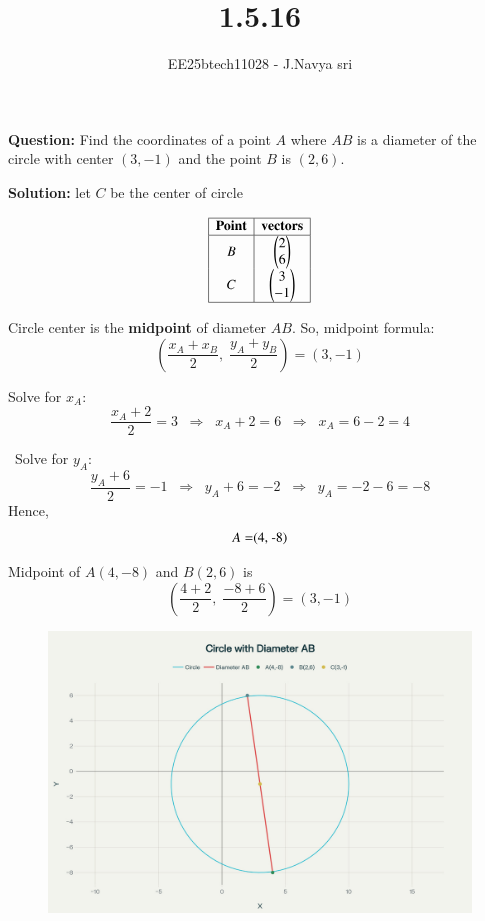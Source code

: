 \documentclass[journal]{IEEEtran}
\begin{document}

\vspace{3cm}

\title{1.5.16}
\author{EE25btech11028 - J.Navya sri}
{\let\newpage\relax\maketitle}

\renewcommand{\thefigure}{\theenumi}
\renewcommand{\thetable}{\theenumi}
\setlength{\intextsep}{10pt} %


\renewcommand{\thetable}{\theenumi}
\textbf{Question:}  
Find the coordinates of a point $A$ where $AB$ is a diameter of the circle with center  
$(3, -1)$ and the point $B$ is $(2, 6)$.

\textbf{Solution:}
let $C$ be the center of circle
\bigskip

 

\[
\begin{array}{|c|c|c|c|}
\hline
\textbf{Point} & \textbf{vectors}\\
\hline
B & $\myvec{2\\6}$  \\
C & $\myvec{3\\-1}$ \\
\hline
\end{array}
\]

\begin{enumerate}
 Circle center is the \textbf{midpoint} of diameter $AB$.  
    So, midpoint formula:  
    \[
    \left( \frac{x_A + x_B}{2}, \; \frac{y_A + y_B}{2} \right) = (3, -1)
    \]

 Solve for $x_A$:  
    \[
    \frac{x_A + 2}{2} = 3 \;\;\Rightarrow\;\; x_A + 2 = 6 \;\;\Rightarrow\;\; x_A = 6 - 2 = 4
    \]

    \ Solve for $y_A$:  
    \[
    \frac{y_A + 6}{2} = -1 \;\;\Rightarrow\;\; y_A + 6 = -2 \;\;\Rightarrow\;\; y_A = -2 - 6 = -8
    \]
Hence,  
    \[
    A = $(4, -8)$
    \]
\end{enumerate}

Midpoint of $A(4, -8)$ and $B(2, 6)$ is  
\[
\left( \frac{4+2}{2}, \; \frac{-8+6}{2} \right) = (3, -1)

\]

\begin{figure} [H]
    \centering
    \includegraphics[width=0.8\columnwidth]{figs/fig.png}
    
    \label{fig:placeholder}
\end{figure}
\end{document}
